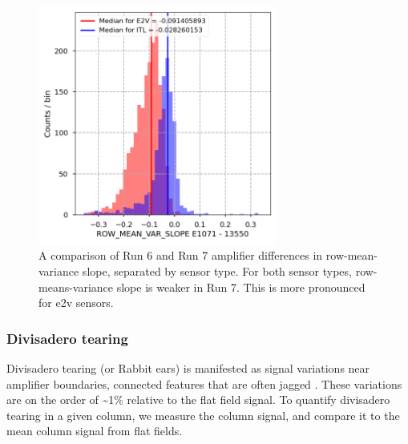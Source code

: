 \begin{figure}[ht]
\begin{centering}
\includegraphics[width=0.7\textwidth]{figures/baselineCharacterization/ROW_MEAN_VAR_SLOPE_13550_E1071_diff.png}
\caption{A comparison of Run 6 and Run 7 amplifier differences in row-mean-variance slope, separated by sensor type. For both sensor types, row-means-variance slope is weaker in Run 7. This is more pronounced for e2v sensors.}
\end{centering}
\end{figure}

\clearpage
\subsubsection{Divisadero tearing}\label{sec:divisadero:init}

Divisadero tearing (or Rabbit ears) is manifested as signal variations near amplifier boundaries, connected features that are often jagged \cite{2020arXiv200209439J,2024SPIE13103E..0WU}. These variations are on the order of \textasciitilde1\% relative to the flat field signal. To quantify divisadero tearing in a given column, we measure the column signal, and compare it to the mean column signal from flat fields.

